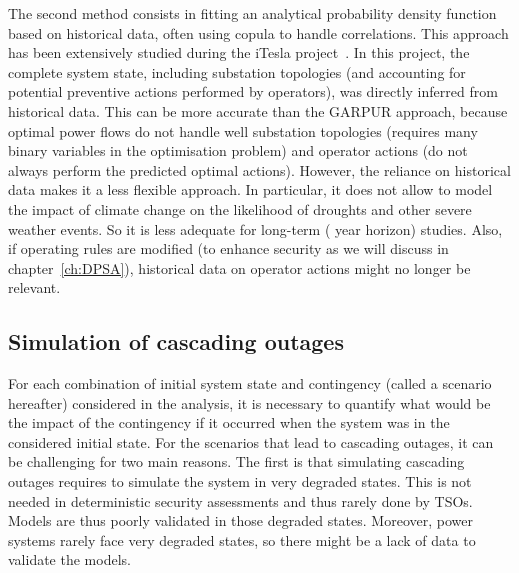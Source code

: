 The second method consists in fitting an analytical probability density function based on historical data, often using copula to handle correlations. This approach has been extensively studied during the iTesla project~\cite{KonstantelosCopulas, EurostagHPC}. In this project, the complete system state, including substation topologies (and accounting for potential preventive actions performed by operators), was directly inferred from historical data. This can be more accurate than the GARPUR approach, because optimal power flows do not handle well substation topologies (requires many binary variables in the optimisation problem) and operator actions (do not always perform the predicted optimal actions). However, the reliance on historical data makes it a less flexible approach. In particular, it does not allow to model the impact of climate change on the likelihood of droughts and other severe weather events. So it is less adequate for long-term ( year horizon) studies. Also, if operating rules are modified (\eg to enhance security as we will discuss in chapter~\ref{ch:DPSA}), historical data on operator actions might no longer be relevant.



\subsection{Simulation of cascading outages}
\label{sec:cascading}

For each combination of initial system state and contingency (called a scenario hereafter) considered in the analysis, it is necessary to quantify what would be the impact of the contingency if it occurred when the system was in the considered initial state. For the scenarios that lead to cascading outages, it can be challenging for two main reasons. The first is that simulating cascading outages requires to simulate the system in very degraded states. This is not needed in deterministic security assessments and thus rarely done by TSOs. Models are thus poorly validated in those degraded states. Moreover, power systems rarely face very degraded states, so there might be a lack of data to validate the models.

